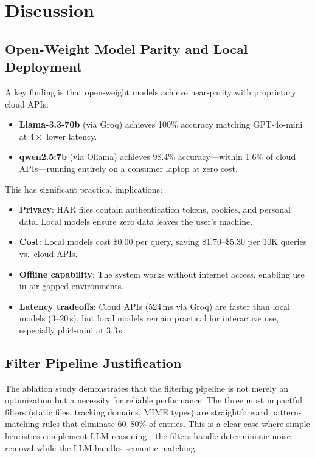 \documentclass[10pt,twocolumn]{article}
\begin{document}
\section{Discussion}

\subsection{Open-Weight Model Parity and Local Deployment}

A key finding is that open-weight models achieve near-parity with proprietary cloud APIs:
\begin{itemize}[nosep]
  \item \textbf{Llama-3.3-70b} (via Groq) achieves 100\% accuracy matching GPT-4o-mini at $4\times$ lower latency.
  \item \textbf{qwen2.5:7b} (via Ollama) achieves 98.4\% accuracy---within 1.6\% of cloud APIs---running entirely on a consumer laptop at zero cost.
\end{itemize}

This has significant practical implications:
\begin{itemize}[nosep]
  \item \textbf{Privacy}: HAR files contain authentication tokens, cookies, and personal data. Local models ensure zero data leaves the user's machine.
  \item \textbf{Cost}: Local models cost \$0.00 per query, saving \$1.70--\$5.30 per 10K queries vs.\ cloud APIs.
  \item \textbf{Offline capability}: The system works without internet access, enabling use in air-gapped environments.
  \item \textbf{Latency tradeoffs}: Cloud APIs (524\,ms via Groq) are faster than local models (3--20\,s), but local models remain practical for interactive use, especially phi4-mini at 3.3\,s.
\end{itemize}

\subsection{Filter Pipeline Justification}

The ablation study demonstrates that the filtering pipeline is not merely an optimization but a necessity for reliable performance. The three most impactful filters (static files, tracking domains, MIME types) are straightforward pattern-matching rules that eliminate 60--80\% of entries. This is a clear case where simple heuristics complement LLM reasoning---the filters handle deterministic noise removal while the LLM handles semantic matching.
\end{document}
